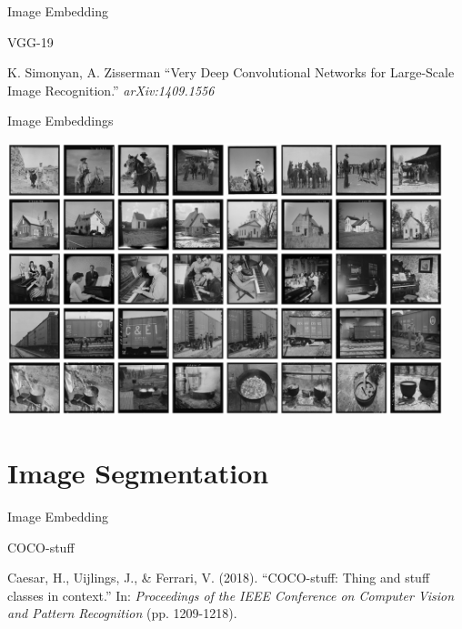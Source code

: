 \documentclass[12pt,ignorenonframetext,aspectratio=169]{beamer}
\makeatletter
\newcommand{\orange}[1]{\textcolor{solarized@orange}{#1}}
\makeatother
\begin{document}
\begin{frame}{Image Embedding}

\orange{VGG-19}

K. Simonyan, A. Zisserman ``Very Deep Convolutional Networks for Large-Scale Image
Recognition.'' \textit{arXiv:1409.1556}

\end{frame}

\begin{frame}{Image Embeddings}

\begin{center}
\includegraphics[width=0.95\textwidth]{img/fig3.jpg}
\end{center}

\end{frame}

\section{Image Segmentation}

\begin{frame}{Image Embedding}

\orange{COCO-stuff}

Caesar, H., Uijlings, J., \& Ferrari, V. (2018). ``COCO-stuff: Thing and stuff classes
in context.'' In: \textit{Proceedings of the IEEE Conference on Computer Vision and Pattern
Recognition} (pp. 1209-1218).

\end{frame}
\end{document}
